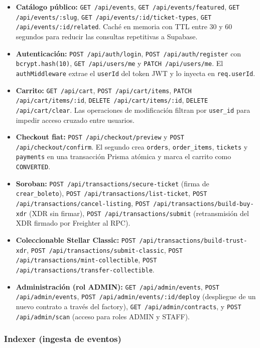 \begin{itemize}
    \item \textbf{Catálogo público:} \texttt{GET /api/events}, \texttt{GET /api/events/featured}, \texttt{GET /api/events/:slug}, \texttt{GET /api/events/:id/ticket-types}, \texttt{GET /api/events/:id/related}. Caché en memoria con TTL entre 30 y 60 segundos para reducir las consultas repetitivas a Supabase.
    \item \textbf{Autenticación:} \texttt{POST /api/auth/login}, \texttt{POST /api/auth/register} con \texttt{bcrypt.hash(10)}, \texttt{GET /api/users/me} y \texttt{PATCH /api/users/me}. El \texttt{authMiddleware} extrae el \texttt{userId} del token JWT y lo inyecta en \texttt{req.userId}.
    \item \textbf{Carrito:} \texttt{GET /api/cart}, \texttt{POST /api/cart/items}, \texttt{PATCH /api/cart/items/:id}, \texttt{DELETE /api/cart/items/:id}, \texttt{DELETE /api/cart/clear}. Las operaciones de modificación filtran por \texttt{user\_id} para impedir acceso cruzado entre usuarios.
    \item \textbf{Checkout fiat:} \texttt{POST /api/checkout/preview} y \texttt{POST /api/checkout/confirm}. El segundo crea \texttt{orders}, \texttt{order\_items}, \texttt{tickets} y \texttt{payments} en una transacción Prisma atómica y marca el carrito como \texttt{CONVERTED}.
    \item \textbf{Soroban:} \texttt{POST /api/transactions/secure-ticket} (firma de \texttt{crear\_boleto}), \texttt{POST /api/transactions/list-ticket}, \texttt{POST /api/transactions/cancel-listing}, \texttt{POST /api/transactions/build-buy-xdr} (XDR sin firmar), \texttt{POST /api/transactions/submit} (retransmisión del XDR firmado por Freighter al RPC).
    \item \textbf{Coleccionable Stellar Classic:} \texttt{POST /api/transactions/build-trust-xdr}, \texttt{POST /api/transactions/submit-classic}, \texttt{POST /api/transactions/mint-collectible}, \texttt{POST /api/transactions/transfer-collectible}.
    \item \textbf{Administración (rol ADMIN):} \texttt{GET /api/admin/events}, \texttt{POST /api/admin/events}, \texttt{POST /api/admin/events/:id/deploy} (despliegue de un nuevo contrato a través del factory), \texttt{GET /api/admin/contracts}, y \texttt{POST /api/admin/scan} (acceso para roles ADMIN y STAFF).
\end{itemize}

\subsubsection{Indexer (ingesta de eventos)}

